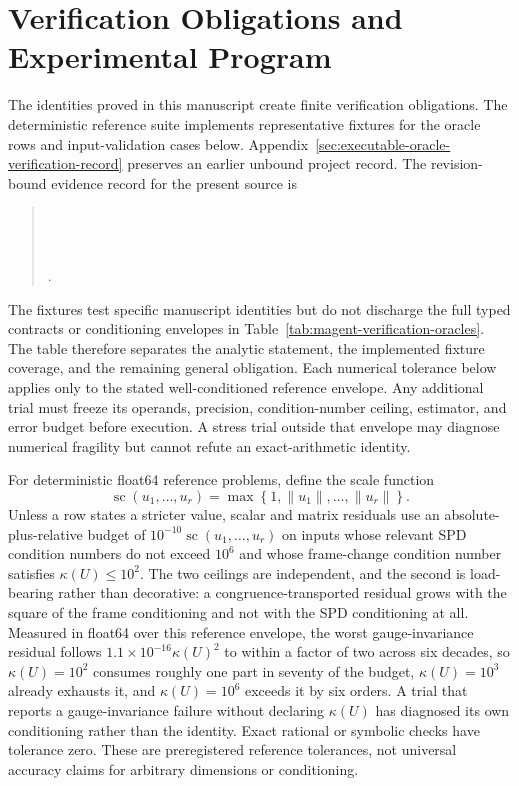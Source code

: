 \chapter[Verification Obligations and Experimental Program]{Verification Obligations and\\Experimental Program}
\label{ch:verification-program}

The identities proved in this manuscript create finite verification obligations. The deterministic reference suite implements representative fixtures for the oracle rows and input-validation cases below. Appendix~\ref{sec:executable-oracle-verification-record} preserves an earlier unbound project record. The revision-bound evidence record for the present source is
\begin{quote}
\small
{}\\
\\
\\
.
\end{quote}
The fixtures test specific manuscript identities but do not discharge the full typed contracts or conditioning envelopes in Table~\ref{tab:magent-verification-oracles}. The table therefore separates the analytic statement, the implemented fixture coverage, and the remaining general obligation. Each numerical tolerance below applies only to the stated well-conditioned reference envelope. Any additional trial must freeze its operands, precision, condition-number ceiling, estimator, and error budget before execution. A stress trial outside that envelope may diagnose numerical fragility but cannot refute an exact-arithmetic identity.

For deterministic float64 reference problems, define the scale function
\begin{equation}
\operatorname{sc}(u_1,\ldots,u_r)
=\max\left\{1,\lVert u_1\rVert,\ldots,\lVert u_r\rVert\right\}.
\label{eq:verification-scale-function}
\end{equation}
Unless a row states a stricter value, scalar and matrix residuals use an absolute-plus-relative budget of \(10^{-10}\operatorname{sc}(u_1,\ldots,u_r)\) on inputs whose relevant SPD condition numbers do not exceed \(10^6\) and whose frame-change condition number satisfies \(\kappa(U)\leq10^{2}\). The two ceilings are independent, and the second is load-bearing rather than decorative: a congruence-transported residual grows with the square of the frame conditioning and not with the SPD conditioning at all. Measured in float64 over this reference envelope, the worst gauge-invariance residual follows \(1.1\times10^{-16}\kappa(U)^2\) to within a factor of two across six decades, so \(\kappa(U)=10^{2}\) consumes roughly one part in seventy of the budget, \(\kappa(U)=10^{3}\) already exhausts it, and \(\kappa(U)=10^{6}\) exceeds it by six orders. A trial that reports a gauge-invariance failure without declaring \(\kappa(U)\) has diagnosed its own conditioning rather than the identity. Exact rational or symbolic checks have tolerance zero. These are preregistered reference tolerances, not universal accuracy claims for arbitrary dimensions or conditioning.

